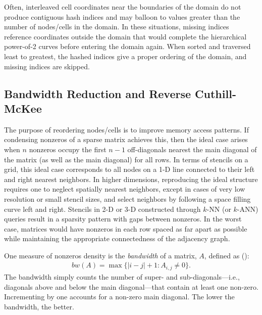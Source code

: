 \documentclass{report}
\begin{document}


Often, interleaved cell coordinates near the boundaries of the domain do not produce contiguous hash indices and may balloon to values greater than the number of nodes/cells in the domain. In these situations, missing indices reference coordinates outside the domain that would complete the hierarchical power-of-2 curves before entering the domain again. When sorted and traversed least to greatest, the hashed indices give a proper ordering of the domain, and missing indices are skipped. 



\subsection{Bandwidth Reduction and Reverse Cuthill-McKee} 

The purpose of reordering nodes/cells is to improve memory access patterns. If condensing nonzeros of a sparse matrix achieves this, then the ideal case arises when $n$ nonzeros occupy the first $n-1$ off-diagonals nearest the main diagonal of the matrix (as well as the main diagonal) for all rows. In terms of stencils on a grid, this ideal case corresponds to all nodes on a 1-D line connected to their left and right nearest neighbors. In higher dimensions, reproducing the ideal structure requires one to neglect spatially nearest neighbors, except in cases of very low resolution or small stencil sizes, and select neighbors by following a space filling curve left and right. Stencils in 2-D or 3-D constructed through $k$-NN (or $k$-ANN) queries result in a sparsity pattern with gaps between nonzeros. In the worst case, matrices would have nonzeros in each row spaced as far apart as possible while maintaining the appropriate connectedness of the adjacency graph. 


One measure of nonzeros density is the \emph{bandwidth} of a matrix, $A$, defined as (\cite{Cuthill1969, LiuSherman1976}): 
\begin{align*}
bw(A) = \max\{|i - j| + 1 : A_{i,j} \neq 0\}.
\end{align*}
The bandwidth simply counts the number of super- and sub-diagonals---i.e., diagonals above and below the main diagonal---that contain at least one non-zero. Incrementing by one accounts for a non-zero main diagonal. The lower the bandwidth, the better. 
\end{document}
